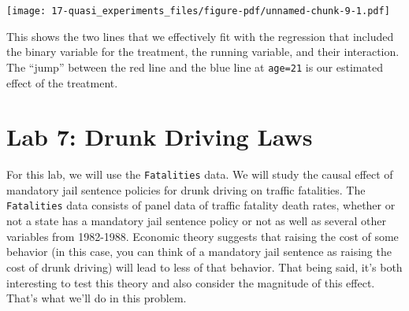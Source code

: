 \documentclass[
  letterpaper,
  DIV=11,
  numbers=noendperiod]{scrreprt}
\newenvironment{Shaded}{\begin{snugshade}}{\end{snugshade}}
\newcommand{\AttributeTok}[1]{\textcolor[rgb]{0.40,0.45,0.13}{#1}}
\newcommand{\CommentTok}[1]{\textcolor[rgb]{0.37,0.37,0.37}{#1}}
\newcommand{\DecValTok}[1]{\textcolor[rgb]{0.68,0.00,0.00}{#1}}
\newcommand{\FunctionTok}[1]{\textcolor[rgb]{0.28,0.35,0.67}{#1}}
\newcommand{\NormalTok}[1]{\textcolor[rgb]{0.00,0.23,0.31}{#1}}
\newcommand{\OtherTok}[1]{\textcolor[rgb]{0.00,0.23,0.31}{#1}}
\newcommand{\SpecialCharTok}[1]{\textcolor[rgb]{0.37,0.37,0.37}{#1}}
\newcommand{\StringTok}[1]{\textcolor[rgb]{0.13,0.47,0.30}{#1}}
\begin{document}
\begin{Shaded}
\end{Shaded}

\texttt{[image: 17-quasi\_experiments\_files/figure-pdf/unnamed-chunk-9-1.pdf]}

This shows the two lines that we effectively fit with the regression
that included the binary variable for the treatment, the running
variable, and their interaction. The ``jump'' between the red line and
the blue line at \texttt{age=21} is our estimated effect of the
treatment.

\section{Lab 7: Drunk Driving Laws}\label{lab-7-drunk-driving-laws}

For this lab, we will use the \texttt{Fatalities} data. We will study
the causal effect of mandatory jail sentence policies for drunk driving
on traffic fatalities. The \texttt{Fatalities} data consists of panel
data of traffic fatality death rates, whether or not a state has a
mandatory jail sentence policy or not as well as several other variables
from 1982-1988. Economic theory suggests that raising the cost of some
behavior (in this case, you can think of a mandatory jail sentence as
raising the cost of drunk driving) will lead to less of that behavior.
That being said, it's both interesting to test this theory and also
consider the magnitude of this effect. That's what we'll do in this
problem.
\end{document}
